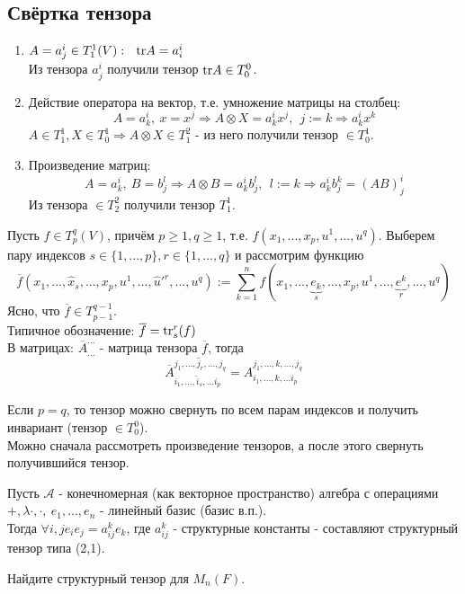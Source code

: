 \subsection{Свёртка тензора}
\begin{example} \tab
    \begin{enumerate}
        \item $A = a^i_j \in T_1^1(V): \ \ \textup{tr} A = a_i^i$\\
        Из тензора $a^i_j$ получили тензор $\textup{tr} A \in T_0^0$.
        \item Действие оператора на вектор, т.е. умножение матрицы на столбец:
        \[A = a^i_k, \ x = x^j \Longrightarrow A \otimes X = a^i_kx^j, \ \ j := k \Longrightarrow a^i_kx^k\]
        $A \in T_1^1, X \in T^1_0 \Longrightarrow A \otimes X \in T^2_1$ - из него получили тензор $\in T^1_0$.
        \item Произведение матриц:
        \[A = a^i_k, \ B = b^l_j \Longrightarrow A \otimes B = a^i_kb^l_j, \ \ l := k \Longrightarrow a^i_kb^k_j = (AB)^i_j\]
        Из тензора $\in T^2_2$ получили тензор $T^1_1$.
    \end{enumerate}
\end{example}
\begin{definition}
    Пусть $f \in T^q_p(V)$, причём $p \geqslant 1, q \geqslant 1$, т.е. $f(x_1,...,x_p, u^1,...,u^q)$. Выберем пару индексов $s \in \{1,...,p\}, r\in \{1,...,q\}$ и рассмотрим функцию 
    \[\overline{f}(x_1,...,\hat{x}_s,...,x_p,u^1,...,\hat{u}'^r,...,u^q) := \sum \limits_{k=1}^n f(x_1,...,\underbrace{e_k}_{s},...,x_p,u^1,...,\underbrace{e^k}_{r},...,u^q)\] 
    Ясно, что $\overline{f} \in T^{q-1}_{p-1}$.\\
    Типичное обозначение: $\overline{f} = \textup{tr}_s^r(f)$\\
    В матрицах: $\overline{A}_{...}^{...}$ - матрица тензора $\overline{f}$, тогда
    \[\overline{A}_{i_1,...,\hat{i}_s,...i_p}^{j_1,...,\hat{j}_r,...,j_q} = A_{i_1,...,k,...i_p}^{j_1,...,k,...,j_q}\]
\end{definition}
Если $p=q$, то тензор можно свернуть по всем парам индексов и получить инвариант (тензор $\in T_0^0$).\\
Можно сначала рассмотреть произведение тензоров, а после этого свернуть получившийся тензор.
\begin{example1}
    Пусть $\mathcal{A}$ - конечномерная (как векторное пространство) алгебра с операциями $+, \lambda\cdot, \cdot, \ e_1,...,e_n$ - линейный базис (базис в.п.).\\
    Тогда $\forall i,j e_ie_j = a_{ij}^ke_k$, где $a_{ij}^k$ - структурные константы - составляют структурный тензор типа (2,1).
\end{example1}
\begin{exercise}
    Найдите структурный тензор для $M_n(F)$.
\end{exercise}
